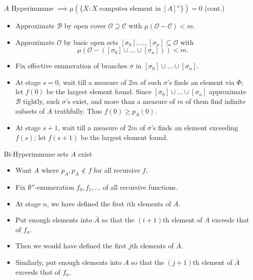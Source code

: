 \begin{frame}{$A$ Hyperimmune $\implies \mu(\{X: X\; \text{computes
element in}\; [A]^\omega\}) =0$ (cont.)}
  \begin{itemize}
    \item Approximate $\mathcal{B}$ by open cover
      $\mathcal{O}\supseteq\mathcal{C}$ with
      $\mu(\mathcal{O}-\mathcal{C})<m$.
    \item Approximate $\mathcal{O}$ by basic open sets
      $[\sigma_0],\ldots,[\sigma_n] \subseteq\mathcal{O}$ with
      \[\mu(\mathcal{O}-([\sigma_0]\cup\ldots\cup[\sigma_n])) <m.\]
    \item Fix effective enumeration of branches $\sigma$ in
      $[\sigma_0]\cup\ldots\cup[\sigma_n]$.
    \item At stage $s=0$, wait till a measure of $2m$ of such $\sigma$'s
      finds an element via $\Phi$; let $f(0)$ be the largest element found.
      Since $[\sigma_0]\cup\ldots\cup[\sigma_n]$ approximate $\mathcal{B}$
      tightly, such $\sigma$'s exist, and more than a measure of $m$ of
      them find infinite subsets of $A$ truthfully. Thus $f(0)\geq p_A(0)$.
    \item At stage $s+1$, wait till a measure of $2m$ of $\sigma$'s
      finds an element exceeding $f(s)$; let $f(s+1)$ be the largest
      element found.
  \end{itemize}
\end{frame}

\begin{frame}{Bi-Hyperimmune sets $A$ exist}
  \begin{itemize}
    \item Want $A$ where $p_A,p_{\bar{A}}\not<f$ for all recursive $f$.
    \item Fix $\emptyset''$-enumeration $f_0,f_1,\ldots$ of all recursive
      functions.
    \item At stage $n$, we have defined the first $i$th elements of $A$.
    \item Put enough elements into $\bar{A}$ so that the $(i+1)$th element
      of $A$ exceeds that of $f_n$.
    \item Then we would have defined the first $j$th elements of $\bar{A}$.
    \item Similarly, put enough elements into $A$ so that the $(j+1)$th
      element of $\bar{A}$ exceeds that of $f_n$.
  \end{itemize}
\end{frame}
